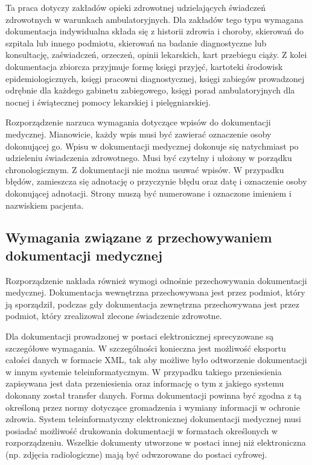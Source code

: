 Ta praca dotyczy zakładów opieki zdrowotnej udzielających świadczeń zdrowotnych w warunkach ambulatoryjnych. Dla zakładów tego typu wymagana dokumentacja indywidualna składa się z historii zdrowia i choroby, skierowań do szpitala lub innego podmiotu, skierowań na badanie diagnostyczne lub konsultację, zaświadczeń, orzeczeń, opinii lekarskich, kart przebiegu ciąży.  Z kolei dokumentacja zbiorcza przyjmuje formę księgi przyjęć, kartoteki środowisk epidemiologicznych, księgi pracowni diagnostycznej, księgi zabiegów prowadzonej odrębnie dla każdego gabinetu zabiegowego, księgi porad ambulatoryjnych dla nocnej i świątecznej pomocy lekarskiej i pielęgniarskiej. 

 
Rozporządzenie narzuca wymagania dotyczące wpisów do dokumentacji medycznej. Mianowicie, każdy wpis musi być zawierać oznaczenie osoby dokonującej go. Wpisu w dokumentacji medycznej dokonuje się natychmiast po udzieleniu świadczenia zdrowotnego. Musi być czytelny i ułożony w porządku chronologicznym. Z dokumentacji nie można usuwać wpisów. W przypadku błędów, zamieszcza się adnotację o przyczynie błędu oraz datę i oznaczenie osoby dokonującej adnotacji. Strony muszą być numerowane i oznaczone imieniem i nazwiskiem pacjenta.

\subsection[Wymagania związane z przechowywaniem dokumentacji medycznej][Wymagania związane z przechowywaniem dokumentacji medycznej]{Wymagania związane z przechowywaniem dokumentacji medycznej}

Rozporządzenie nakłada również wymogi odnośnie przechowywania dokumentacji medycznej. Dokumentacja wewnętrzna przechowywana jest przez podmiot, który ją sporządził, podczas gdy dokumentacja zewnętrzna przechowywana jest przez podmiot, który zrealizował zlecone świadczenie zdrowotne.

Dla dokumentacji prowadzonej w postaci elektronicznej sprecyzowane są szczegółowe wymagania. W szczególności konieczna jest możliwość eksportu całości danych w formacie XML, tak aby możliwe było odtworzenie dokumentacji w innym systemie teleinformatycznym. W przypadku takiego przeniesienia zapisywana jest data przeniesienia oraz informację o tym z jakiego systemu dokonany został transfer danych. Forma dokumentacji powinna być zgodna z tą określoną przez normy dotyczące gromadzenia i wymiany informacji w ochronie zdrowia. System teleinformatyczny elektronicznej dokumentacji medycznej musi posiadać możliwość drukowania dokumentacji w formatach określonych w rozporządzeniu. Wszelkie dokumenty utworzone w postaci innej niż elektroniczna (np. zdjęcia radiologiczne) mają być odwzorowane do postaci cyfrowej.


